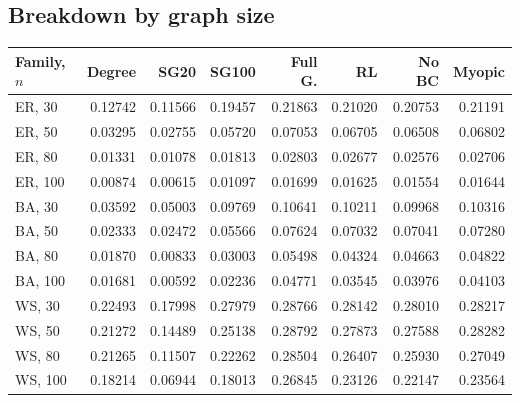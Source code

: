 \documentclass[11pt]{article}
\begin{document}
\subsection{Breakdown by graph size}
\begin{longtable}{lrrrrrrr}
\toprule Family, $n$ & Degree & SG20 & SG100 & Full G. & RL & No BC & Myopic\\ \midrule\endhead
ER, 30 & 0.12742 & 0.11566 & 0.19457 & 0.21863 & 0.21020 & 0.20753 & 0.21191\\
ER, 50 & 0.03295 & 0.02755 & 0.05720 & 0.07053 & 0.06705 & 0.06508 & 0.06802\\
ER, 80 & 0.01331 & 0.01078 & 0.01813 & 0.02803 & 0.02677 & 0.02576 & 0.02706\\
ER, 100 & 0.00874 & 0.00615 & 0.01097 & 0.01699 & 0.01625 & 0.01554 & 0.01644\\
BA, 30 & 0.03592 & 0.05003 & 0.09769 & 0.10641 & 0.10211 & 0.09968 & 0.10316\\
BA, 50 & 0.02333 & 0.02472 & 0.05566 & 0.07624 & 0.07032 & 0.07041 & 0.07280\\
BA, 80 & 0.01870 & 0.00833 & 0.03003 & 0.05498 & 0.04324 & 0.04663 & 0.04822\\
BA, 100 & 0.01681 & 0.00592 & 0.02236 & 0.04771 & 0.03545 & 0.03976 & 0.04103\\
WS, 30 & 0.22493 & 0.17998 & 0.27979 & 0.28766 & 0.28142 & 0.28010 & 0.28217\\
WS, 50 & 0.21272 & 0.14489 & 0.25138 & 0.28792 & 0.27873 & 0.27588 & 0.28282\\
WS, 80 & 0.21265 & 0.11507 & 0.22262 & 0.28504 & 0.26407 & 0.25930 & 0.27049\\
WS, 100 & 0.18214 & 0.06944 & 0.18013 & 0.26845 & 0.23126 & 0.22147 & 0.23564\\
\bottomrule\end{longtable}
\end{document}
